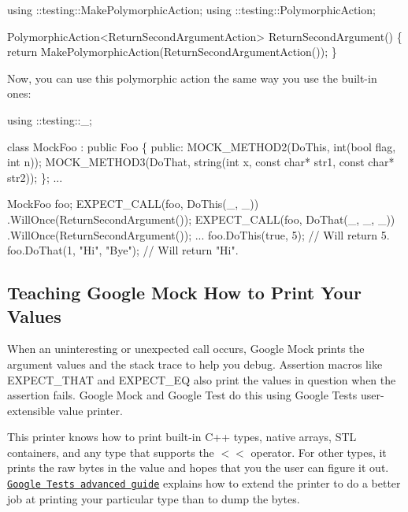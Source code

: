 \begin{DoxyCode}
using ::testing::MakePolymorphicAction;
using ::testing::PolymorphicAction;

PolymorphicAction<ReturnSecondArgumentAction> ReturnSecondArgument() \{
  return MakePolymorphicAction(ReturnSecondArgumentAction());
\}
\end{DoxyCode}


Now, you can use this polymorphic action the same way you use the built-\/in ones\+:


\begin{DoxyCode}
using ::testing::\_;

class MockFoo : public Foo \{
 public:
  MOCK\_METHOD2(DoThis, int(bool flag, int n));
  MOCK\_METHOD3(DoThat, string(int x, const char* str1, const char* str2));
\};
...

  MockFoo foo;
  EXPECT\_CALL(foo, DoThis(\_, \_))
      .WillOnce(ReturnSecondArgument());
  EXPECT\_CALL(foo, DoThat(\_, \_, \_))
      .WillOnce(ReturnSecondArgument());
  ...
  foo.DoThis(true, 5);         // Will return 5.
  foo.DoThat(1, "Hi", "Bye");  // Will return "Hi".
\end{DoxyCode}


\subsection*{Teaching Google Mock How to Print Your Values}

When an uninteresting or unexpected call occurs, Google Mock prints the argument values and the stack trace to help you debug. Assertion macros like {\ttfamily E\+X\+P\+E\+C\+T\+\_\+\+T\+H\+AT} and {\ttfamily E\+X\+P\+E\+C\+T\+\_\+\+EQ} also print the values in question when the assertion fails. Google Mock and Google Test do this using Google Test\textquotesingle{}s user-\/extensible value printer.

This printer knows how to print built-\/in C++ types, native arrays, S\+TL containers, and any type that supports the {\ttfamily $<$$<$} operator. For other types, it prints the raw bytes in the value and hopes that you the user can figure it out. \href{http://code.google.com/p/googletest/wiki/V1_6_AdvancedGuide#Teaching_Google_Test_How_to_Print_Your_Values}{\tt Google Test\textquotesingle{}s advanced guide} explains how to extend the printer to do a better job at printing your particular type than to dump the bytes. 